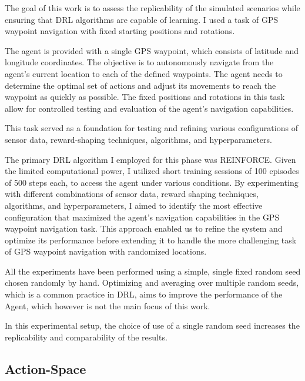 \begin{textblock}
The goal of this work is to assess the replicability of the simulated scenarios while ensuring that DRL algorithms are capable of learning. I used a task of GPS waypoint navigation with fixed starting positions and rotations. 

The agent is provided with a single GPS waypoint, which consists of latitude and longitude coordinates. The objective is to autonomously navigate from the agent's current location to each of the defined waypoints\cite{waypointwiki}. The agent needs to determine the optimal set of actions and adjust its movements to reach the waypoint as quickly as possible. The fixed positions and rotations in this task allow for controlled testing and evaluation of the agent's navigation capabilities.

This task served as a foundation for testing and refining various configurations of sensor data, reward-shaping techniques, algorithms, and hyperparameters.

The primary DRL algorithm I employed for this phase was REINFORCE. Given the limited computational power, I utilized short training sessions of 100 episodes of 500 steps each, to access the agent under various conditions. By experimenting with different combinations of sensor data, reward shaping techniques, algorithms, and hyperparameters, I aimed to identify the most effective configuration that maximized the agent's navigation capabilities in the GPS waypoint navigation task. This approach enabled us to refine the system and optimize its performance before extending it to handle the more challenging task of GPS waypoint navigation with randomized locations.

All the experiments have been performed using a simple, single fixed random seed chosen randomly by hand. Optimizing and averaging over multiple random seeds, which is a common practice in DRL, aims to improve the performance of the Agent, which however is not the main focus of this work.

In this experimental setup, the choice of use of a single random seed increases the replicability and comparability of the results.
\end{textblock}


\subsection{Action-Space}

